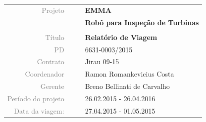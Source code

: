 \vspace{4cm}

\begin{table}[ht!]
	\centering
	\begin{tabular}{r l|l p{12cm} }
		\textcolor{gray}{Projeto} &&& \textbf{\Large EMMA}\\
			&&& \textbf{Robô para Inspeção de Turbinas}\\
			&&& \\
		\textcolor{gray}{Título} &&& \textbf{Relatório de Viagem}\\
		\textcolor{gray}{PD} &&& 6631-0003/2015 \\
		\textcolor{gray}{Contrato} &&& Jirau 09-15\\
		\textcolor{gray}{Coordenador} &&& Ramon Romankevicius Costa \\
		\textcolor{gray}{Gerente} &&& Breno Bellinati de Carvalho \\
		\textcolor{gray}{Período do projeto} &&& 26.02.2015 - 26.04.2016 \\
		\textcolor{gray}{Data da viagem:} &&& 27.04.2015 - 01.05.2015 \\
	\end{tabular}
\end{table}


\cleardoublepage

